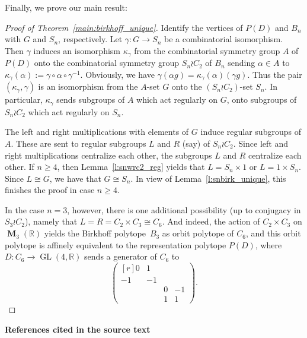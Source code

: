 \documentclass[10pt]{amsart}
\renewcommand{\geq}{\geqslant}
\newcommand{\reals}{\mathbb{R}}
\newcommand{\iso}{\cong}
\DeclareMathOperator{\GL}{GL}
\DeclareMathOperator{\mat}{\mathbf{M}}
\begin{document}
Finally, we prove our main result:
\begin{proof}[Proof of Theorem~\ref{main:birkhoff_unique}]
    Identify the vertices of $P(D)$ and $B_n$
    with $G$ and $S_n$, respectively.
    Let 
    $\gamma\colon G\to S_n$ be a combinatorial isomorphism.
    Then $\gamma$ induces an isomorphism $\kappa_{\gamma}$
    from the combinatorial symmetry group
    $A$ of $P(D)$ onto the combinatorial symmetry group
    $S_n\wr C_2$ of $B_n$ sending 
    $\alpha\in A$ to 
    $\kappa_{\gamma}(\alpha):=\gamma \circ \alpha \circ \gamma^{-1}$.
    Obviously,
    we have $\gamma(\alpha g) = \kappa_{\gamma}(\alpha)(\gamma g)$.
    Thus the pair
    $(\kappa_{\gamma}, \gamma)$ is an isomorphism
    from the $A$-set $G$ onto the 
    $(S_n\wr C_2)$-set $S_n$.    
    In particular, $\kappa_{\gamma}$ sends subgroups
    of $A$ which act regularly on $G$, onto subgroups
    of $S_n \wr C_2$ which act regularly on $S_n$.

    The left and right multiplications with elements of $G$
    induce regular subgroups of $A$.
    These are sent to regular subgroups
    $L$ and $R$ (say) of $S_n \wr C_2$.
    Since left and right multiplications centralize each other,
    the subgroups $L$ and $R$ centralize each other.
    If $n\geq 4$, then Lemma~\ref{l:snwrc2_reg} yields
    that $L= S_n \times 1$ or $L=1\times S_n$. 
    Since $L\iso G$, we have that $G\iso S_n$.
    In view of Lemma~\ref{l:snbirk_unique},
    this finishes the proof in case $n\geq 4$.
    
    In the case $n=3$, however, there is one additional
    possibility (up to conjugacy in $S_3 \wr C_2$),
    namely that 
    $L= R = C_2 \times C_3\iso C_6$.
    And indeed, the action of
    $C_2\times C_3$ on $\mat_3(\reals)$ yields the 
    Birkhoff polytope~$B_3$ as orbit polytope of $C_6$,    
    and this orbit polytope is affinely equivalent 
    to the representation polytope $P(D)$,
    where $D\colon C_6 \to \GL(4,\reals)$
    sends a generator of $C_6$ to
    \[ \begin{pmatrix*}[r]
         0 & 1 & & \\
        -1 & -1 & & \\
           &    & 0 & -1 \\
           &    & 1 & 1 
       \end{pmatrix*}.
    \]
\end{proof}  
\vspace{1em}
\noindent\textbf{References cited in the source text}\par
\end{document}
